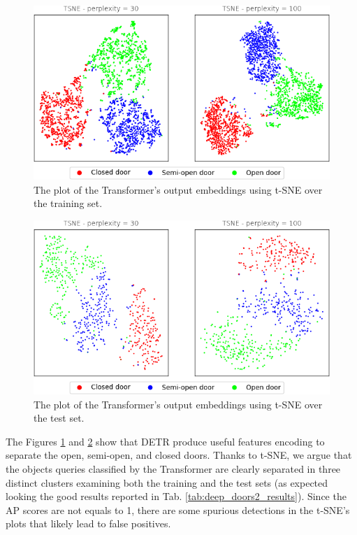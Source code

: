 \begin{figure}[h!]
	\centering
	\includegraphics[width=\linewidth]{images/deep_doors_2_tsne_trainset.png}
	\caption{The plot of the Transformer's output embeddings using t-SNE over the training set.}
	\label{fig:tsne_deep_doors2_train}
\end{figure}

\begin{figure}[h!]
	\centering
	\includegraphics[width=\linewidth]{images/deep_doors_2_tsne_testset.png}
	\caption{The plot of the Transformer's output embeddings using t-SNE over the test set.}
	\label{fig:tsne_deep_doors2_test}
\end{figure}
 
The Figures \ref{fig:tsne_deep_doors2_train} and \ref{fig:tsne_deep_doors2_test} show that DETR produce useful features encoding to separate the open, semi-open, and closed doors. Thanks to t-SNE, we argue that the objects queries classified by the Transformer are clearly separated in three distinct clusters examining both the training and the test sets (as expected looking the good results reported in Tab. \ref{tab:deep_doors2_results}). Since the AP scores are not equals to 1, there are some spurious detections in the t-SNE's plots that likely lead to false positives.

